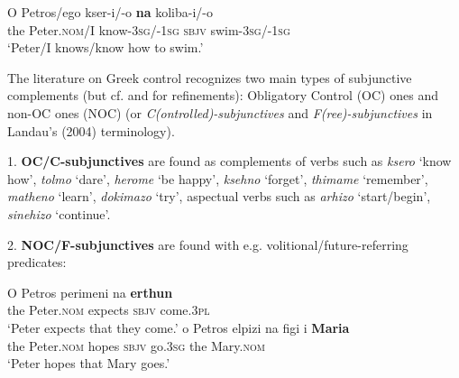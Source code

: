 \documentclass[output=paper]{langsci/langscibook}
\begin{document}
\ea%
 \label{ex:alexiadou:3}
\gll O  Petros/ego  kser-i/-o        \textbf{na}    koliba-i/-o\\
  the    Peter.\textsc{nom}/I  know-\textsc{3sg}/-\textsc{1sg}    \textsc{sbjv}  swim-\textsc{3sg}/-\textsc{1sg}\\
\glt  ‘Peter/I knows/know how to swim.’
\z

The literature on Greek control recognizes two main types of subjunctive complements (but cf. \citealt{Spyropoulos2007a} and \citealt{Roussou2009} for refinements): Obligatory Control (OC) ones and non-OC ones (NOC) (or \textit{C(ontrolled)-subjunctives} and \textit{F(ree)-subjunctives} in Landau's (2004) terminology).


1. \textbf{OC/C-subjunctives} are found as complements of verbs such as \textit{ksero} ‘know how’, \textit{tolmo} ‘dare’, \textit{herome} ‘be happy’, \textit{ksehno} ‘forget’, \textit{thimame} ‘remember’, \textit{matheno} ‘learn’, \textit{dokimazo} ‘try’, aspectual verbs such as \textit{arhizo} ‘start/begin’, \textit{sinehizo} ‘continue’.



\ea%
    \label{ex:alexiadou:4}
\z
\z



2. \textbf{NOC/F-subjunctives} are found with e.g. volitional/future-referring predicates:



\ea%
    \label{ex:alexiadou:5}
    \ea\gll O    Petros      perimeni  na    \textbf{erthun}\\
       the    Peter.\textsc{nom} expects  \textsc{sbjv}  come.\textsc{3pl}\\
        \glt ‘Peter expects that they come.’
     \ex\gll  o     Petros    elpizi  na    figi     i     \textbf{Maria}\\
          the    Peter.\textsc{nom}   hopes  \textsc{sbjv}  go.\textsc{3sg}  the    Mary.\textsc{nom}\\
         \glt ‘Peter hopes that Mary goes.’
\z
\z
\end{document}
